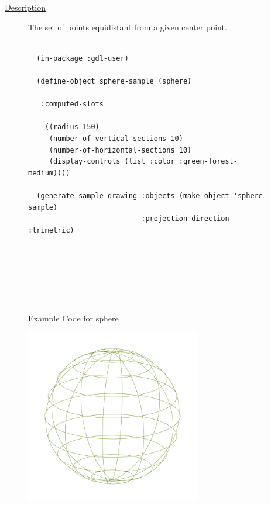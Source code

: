 \documentclass [11pt]{book}
\begin{document}
\begin{itemize}
\begin{description}

\item [
\underline{Description}]


The set of points equidistant from a given center point.



\end{description}




\begin{figure}
\begin{lrbox}{\boxedverb}
\begin{minipage}{\linewidth}
{\small

\begin{verbatim}
  
  (in-package :gdl-user)
  
  (define-object sphere-sample (sphere)
    
   :computed-slots

    ((radius 150)
     (number-of-vertical-sections 10)
     (number-of-horizontal-sections 10)
     (display-controls (list :color :green-forest-medium))))

  (generate-sample-drawing :objects (make-object 'sphere-sample) 
                           :projection-direction :trimetric)





                  

\end{verbatim}}
\end{minipage}
\end{lrbox}
\fbox{\usebox{\boxedverb}}

\caption{Example Code for sphere}

\label{fig:example-code-sphere}

\end{figure}

\begin{figure}
\begin{center}
\includegraphics[width=3in,height=3in]{../images/example-sphere.pdf}
\end{center}


\end{figure}
\end{itemize}
\end{document}

